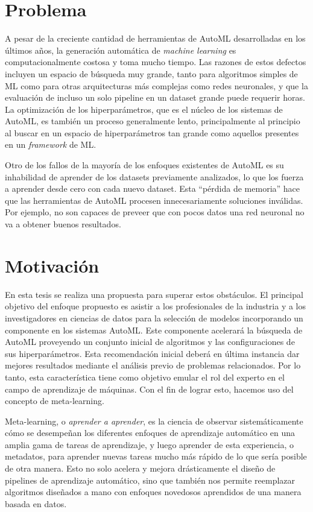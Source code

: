 \section{Problema}

A pesar de la creciente cantidad de herramientas de AutoML desarrolladas en los últimos años, la generación automática de \textit{machine learning} es computacionalmente costosa y toma mucho tiempo. Las razones de estos defectos incluyen un espacio de búsqueda muy grande, tanto para algoritmos simples de ML como para otras arquitecturas más complejas como redes neuronales, y que la evaluación de incluso un solo pipeline en un dataset grande puede requerir horas. La optimización de los hiperparámetros, que es el núcleo de los sistemas de AutoML, es también un proceso generalmente lento, principalmente al principio al buscar en un espacio de hiperparámetros tan grande como aquellos presentes en un \textit{framework} de ML.

Otro de los fallos de la mayoría de los enfoques existentes de AutoML es su inhabilidad de aprender de los datasets previamente analizados, lo que los fuerza a aprender desde cero con cada nuevo dataset. Esta ``pérdida de memoria'' hace que las herramientas de AutoML procesen innecesariamente soluciones inválidas. Por ejemplo, no son capaces de preveer que con pocos datos una red neuronal no va a obtener buenos resultados. 

\section{Motivación}

En esta tesis se realiza una propuesta para superar estos obstáculos. El principal objetivo del enfoque propuesto es asistir a los profesionales de la industria y a los investigadores en ciencias de datos para la selección de modelos incorporando un componente en los sistemas AutoML. Este componente acelerará la búsqueda de AutoML proveyendo un conjunto inicial de algoritmos y las configuraciones de sus hiperparámetros. Esta recomendación inicial deberá en última instancia dar mejores resultados mediante el análisis previo de problemas relacionados. Por lo tanto, esta característica tiene como objetivo emular el rol del experto en el campo de aprendizaje de máquinas. Con el fin de lograr esto, hacemos uso del concepto de meta-learning. 

Meta-learning, o \textit{aprender a aprender}, es la ciencia de observar sistemáticamente cómo se desempeñan los diferentes enfoques de aprendizaje automático en una amplia gama de tareas de aprendizaje, y luego aprender de esta experiencia, o metadatos, para aprender nuevas tareas mucho más rápido de lo que sería posible de otra manera. Esto no solo acelera y mejora drásticamente el diseño de pipelines de aprendizaje automático, sino que también nos permite reemplazar algoritmos diseñados a mano con enfoques novedosos aprendidos de una manera basada en datos.

